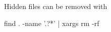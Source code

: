 Hidden files can be removed with
\begin{shellCode}
find . -name '.?*' | xargs rm -rf
\end{shellCode}


% 
%  
% 
%   
% 
%  
% 
%  
